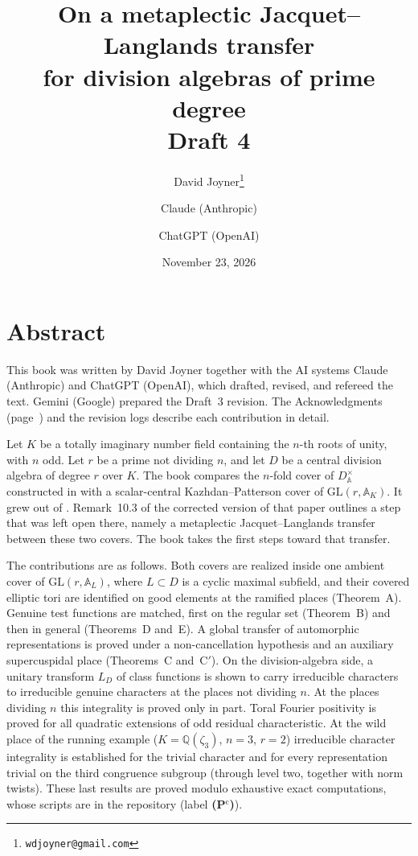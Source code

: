 \documentclass[12pt,letterpaper,oneside]{book}
\title{On a metaplectic Jacquet--Langlands transfer\\ for division algebras of prime degree\\[1em]
\large Draft 4}
\author{David Joyner\thanks{\texttt{wdjoyner@gmail.com}} \and Claude (Anthropic) \and ChatGPT (OpenAI)}
\date{November 23, 2026}
\theoremstyle{plain}
\theoremstyle{definition}
\newcommand{\Pctag}{\textnormal{\textbf{(P$^{\mathrm c}$)}}}
\begin{document}
\frontmatter
\maketitle
\tableofcontents

\chapter{Abstract}
This book was written by David Joyner together with the AI systems
Claude (Anthropic) and ChatGPT (OpenAI), which drafted, revised, and
refereed the text. Gemini (Google) prepared the Draft~3 revision. The
Acknowledgments
(page~\pageref{ch:ack}) and the revision logs describe each
contribution in detail.

Let $K$ be a totally imaginary number field containing the $n$-th roots
of unity, with $n$ odd. Let $r$ be a prime not dividing $n$, and let $D$
be a central division algebra of degree $r$ over $K$. The book compares
the $n$-fold cover of $D^\times_{\mathbb A}$ constructed in \cite{JC26a}
with a scalar-central Kazhdan--Patterson cover of $\mathrm{GL}(r,\mathbb A_K)$.
It grew out of \cite{Jo88}. Remark~10.3 of the corrected version
\cite{JC26a} of that paper outlines a step that was left open there,
namely a metaplectic Jacquet--Langlands transfer between these two
covers. The book takes the first steps toward that transfer.

The contributions are as follows. Both covers are realized inside one
ambient cover of $\mathrm{GL}(r,\mathbb A_L)$, where $L\subset D$ is a
cyclic maximal subfield, and their covered elliptic tori are identified
on good elements at the ramified places (Theorem~A). Genuine test
functions are matched, first on the regular set (Theorem~B) and then in
general (Theorems~D and~E). A global transfer of automorphic
representations is proved under a non-cancellation hypothesis and an
auxiliary supercuspidal place (Theorems~C and~C$'$). On the
division-algebra side, a unitary transform $L_D$ of class functions is
shown to carry irreducible characters to irreducible genuine characters
at the places not dividing $n$. At the places dividing $n$ this
integrality is proved only in part. Toral Fourier positivity is proved
for all quadratic extensions of odd residual characteristic. At the wild
place of the running example ($K=\mathbb Q(\zeta_3)$, $n=3$, $r=2$)
irreducible character integrality is established for the trivial
character and for every representation trivial on the third congruence
subgroup (through level two, together with norm twists). These last
results are proved modulo exhaustive exact computations, whose scripts
are in the repository (label \Pctag).
\end{document}
